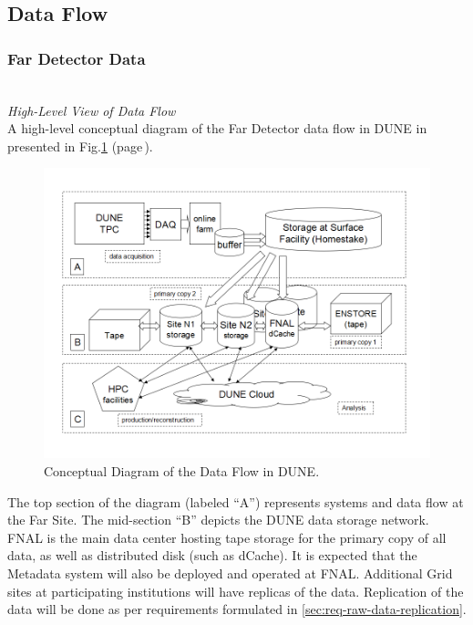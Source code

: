 
\subsection{Data Flow}
\subsubsection{Far Detector Data}
\ 
\\
\noindent
\textit{High-Level View of Data Flow} 
\ 
\\
\noindent
A high-level conceptual diagram of the Far Detector data flow in DUNE in presented in Fig.\ref{fig:DUNEdataflow}
(page\,\pageref{fig:DUNEdataflow}).
\begin{figure}[h!]
\centering
\includegraphics[width=\textwidth]{DUNEdataflow.png}
\caption{Conceptual Diagram of the Data Flow in DUNE.}
\label{fig:DUNEdataflow}
\end{figure}
The top section of the diagram (labeled ``A'') represents systems and data flow at the Far Site.
The mid-section ``B'' depicts the DUNE data storage network. FNAL is the main data center
hosting tape storage for the primary copy of all data, as well as distributed disk (such as dCache).
It is expected that the Metadata system will also be deployed and operated at FNAL.
Additional Grid sites at participating institutions will have replicas of the data.
Replication of the data will be done as per requirements formulated in \ref{sec:req-raw-data-replication}.

